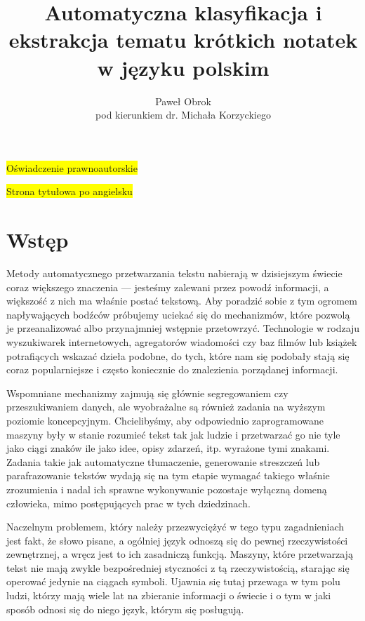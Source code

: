 \documentclass[11pt,a4paper]{article}
\newcommand{\todo}[1]{\colorbox{yellow}{#1}}
\begin{document}
\title{Automatyczna klasyfikacja i ekstrakcja tematu krótkich notatek w języku polskim}
\author{Paweł Obrok\\pod kierunkiem dr. Michała Korzyckiego}

\maketitle
\pagebreak

\todo{Oświadczenie prawnoautorskie}
\pagebreak

\todo{Strona tytułowa po angielsku}
\pagebreak

\tableofcontents
\pagebreak

\section{Wstęp}

Metody automatycznego przetwarzania tekstu nabierają w dzisiejszym świecie
coraz większego znaczenia --- jesteśmy zalewani przez powodź informacji, a
większość z nich ma właśnie postać tekstową. Aby poradzić sobie z tym ogromem
napływających bodźców próbujemy uciekać się do mechanizmów, które pozwolą je
przeanalizować albo przynajmniej wstępnie przetowrzyć. Technologie w rodzaju
wyszukiwarek internetowych, agregatorów wiadomości czy baz filmów lub książek
potrafiących wskazać dzieła podobne, do tych, które nam się podobały stają się
coraz popularniejsze i często koniecznie do znalezienia porządanej informacji.

Wspomniane mechanizmy zajmują się głównie segregowaniem czy przeszukiwaniem
danych, ale wyobrażalne są również zadania na wyższym poziomie koncepcyjnym.
Chcielibyśmy, aby odpowiednio zaprogramowane maszyny były w stanie rozumieć
tekst tak jak ludzie i przetwarzać go nie tyle jako ciągi znaków ile jako idee,
opisy zdarzeń, itp. wyrażone tymi znakami. Zadania takie jak automatyczne
tłumaczenie, generowanie streszczeń lub parafrazowanie tekstów wydają się na
tym etapie wymagać takiego właśnie zrozumienia i nadal ich sprawne wykonywanie
pozostaje wyłączną domeną człowieka, mimo postępujących prac w tych
dziedzinach.

Naczelnym problemem, który należy przezwyciężyć w tego typu zagadnieniach jest
fakt, że słowo pisane, a ogólniej język odnoszą się do pewnej rzeczywistości
zewnętrznej, a wręcz jest to ich zasadniczą funkcją. Maszyny, które
przetwarzają tekst nie mają zwykle bezpośredniej styczności z tą
rzeczywistością, starając się operować jedynie na ciągach symboli. Ujawnia się
tutaj przewaga w tym polu ludzi, którzy mają wiele lat na zbieranie informacji
o świecie i o tym w jaki sposób odnosi się do niego język, którym się
posługują.
\end{document}
